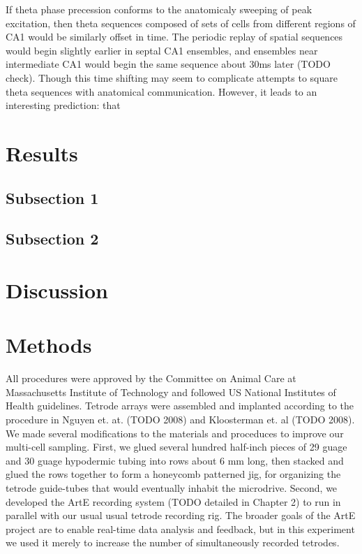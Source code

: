 \documentclass[10pt]{article}
\begin{document}
If theta phase precession conforms to the anatomicaly sweeping of peak excitation, then theta sequences composed of sets of cells from different regions of CA1 would be similarly offset in time. The periodic replay of spatial sequences would begin slightly earlier in septal CA1 ensembles, and ensembles near intermediate CA1 would begin the same sequence about 30ms later (TODO check). Though this time shifting may seem to complicate attempts to square theta sequences with anatomical communication. However, it leads to an interesting prediction: that 

\section*{Results}

\subsection*{Subsection 1}

\subsection*{Subsection 2}

\section*{Discussion}

\cite{Mizuseki 2012}


\section*{Methods}
All procedures were approved by the Committee on Animal Care at Massachusetts Institute of Technology and followed US National Institutes of Health guidelines. Tetrode arrays were assembled and implanted  according to the procedure in Nguyen et. at. (TODO 2008) and Kloosterman et. al (TODO 2008). We made several modifications to the materials and proceduces to improve our multi-cell sampling.  First, we glued several hundred half-inch pieces of 29 guage and 30 guage hypodermic tubing into rows about 6 mm long, then stacked and glued the rows together to form a honeycomb patterned jig, for organizing the tetrode guide-tubes that would eventually inhabit the microdrive. Second, we developed the ArtE recording system (TODO detailed in Chapter 2) to run in parallel with our usual usual tetrode recording rig. The broader goals of the ArtE project are to enable real-time data analysis and feedback, but in this experiment we used it merely to increase the number of simultaneously recorded tetrodes.
\end{document}
